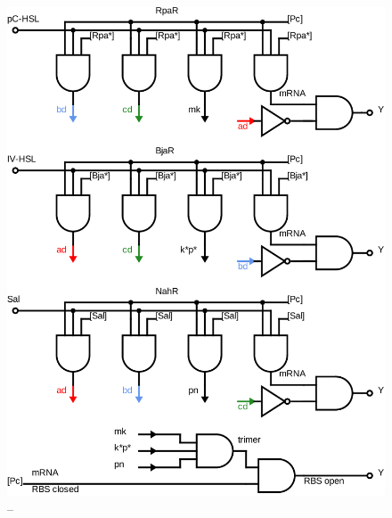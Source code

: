 \documentclass[12pt,notitlepage]{article}
\newcommand{\ra}[1]{{\color{Blue}#1}}
\begin{document}
\begin{figure}[!p]
    \centering
    \includegraphics[height=(\textheight-10\baselineskip)]{circuits/Logical-3xor.svg.pdf}
    \caption{
    \ra{--}
    }
    \label{f:logic_3xor}
\end{figure}

%
\end{document}
